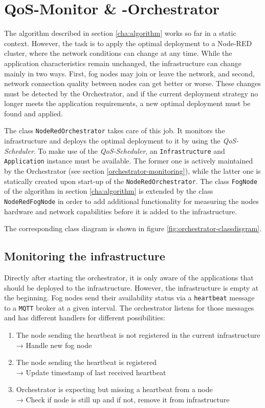 \chapter{QoS-Monitor \& -Orchestrator\label{cha:orchestrator}}

The algorithm described in section \ref{cha:algorithm} works so far in a static context. However, the task is to apply the optimal deployment to a Node-RED cluster, where the network conditions can change at any time. While the application characteristics remain unchanged, the infrastructure can change mainly in two ways. First, fog nodes may join or leave the network, and second, network connection quality between nodes can get better or worse. These changes must be detected by the Orchestrator, and if the current deployment strategy no longer meets the application requirements, a new optimal deployment must be found and applied.

The class \texttt{NodeRedOrchestrator} takes care of this job. It monitors the infrastructure and deploys the optimal deployment to it by using the \textit{QoS-Scheduler}. To make use of the \textit{QoS-Scheduler}, an \texttt{Infrastructure} and \texttt{Application} instance must be available. The former one is actively maintained by the Orchestrator (see section \ref{orchestrator-monitoring}), while the latter one is statically created upon start-up of the \texttt{NodeRedOrchestrator}. The class \texttt{FogNode} of the algorithm in section \ref{cha:algorithm} is extended by the class \texttt{NodeRedFogNode} in order to add additional functionality for measuring the nodes hardware and network capabilities before it is added to the infrastructure.

The corresponding class diagram is shown in figure \ref{fig:orchestrator-classdisgram}.

\section{Monitoring the infrastructure\label{orchestrator-monitoring}}

Directly after starting the orchestrator, it is only aware of the applications that should be deployed to the infrastructure. However, the infrastructure is empty at the beginning. Fog nodes send their availability status via a \texttt{heartbeat} message to a \texttt{MQTT} broker at a given interval. The orchestrator listens for those messages and has different handlers for different possibilities:
\begin{enumerate}
    \item The node sending the heartbeat is not registered in the current infrastructure\\
    → Handle new fog node
    \item The node sending the heartbeat is registered\\
    → Update timestamp of last received heartbeat
    \item Orchestrator is expecting but missing a heartbeat from a node\\
    → Check if node is still up and if not, remove it from infrastructure
\end{enumerate}

